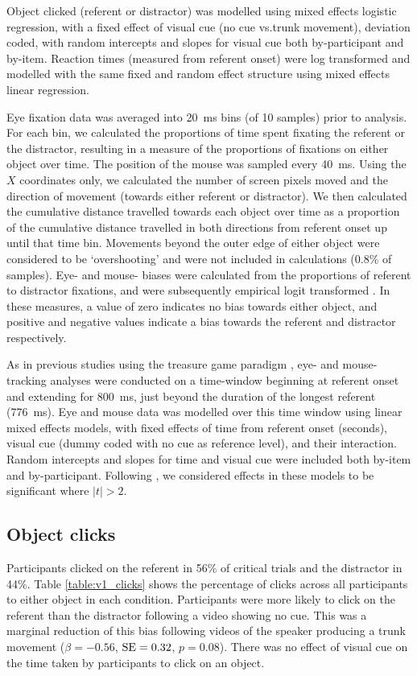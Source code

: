 \documentclass[a4paper,man,natbib]{apa6}
\newcommand{\resultsLog}[3]{$\beta = #1$, $\textnormal{SE} = #2$, $p #3$}
\begin{document}
Object clicked (referent or distractor) was modelled using mixed effects logistic regression, with a fixed effect of visual cue (no cue vs.\@ trunk movement), deviation coded, with random intercepts and slopes for visual cue both by-participant and by-item.
Reaction times (measured from referent onset) were log transformed and modelled with the same fixed and random effect structure using mixed effects linear regression.

Eye fixation data was averaged into 20~ms bins (of 10 samples) prior to analysis.
For each bin, we calculated the proportions of time spent fixating the referent or the distractor, resulting in a measure of the proportions of fixations on either object over time.
The position of the mouse was sampled every 40~ms.
Using the $X$ coordinates only, we calculated the number of screen pixels moved and the direction of movement (towards either referent or distractor).
We then calculated the cumulative distance travelled towards each object over time as a proportion of the cumulative distance travelled in both directions from referent onset up until that time bin.
Movements beyond the outer edge of either object were considered to be `overshooting' and were not included in calculations (0.8\% of samples).
Eye- and mouse- biases were calculated from the proportions of referent to distractor fixations, and were subsequently empirical logit transformed \citep{Barr2008}. 
In these measures, a value of zero indicates no bias towards either object, and positive and negative values indicate a bias towards the referent and distractor respectively.

As in previous studies using the treasure game paradigm \citep{King2018,Loy2017}, eye- and mouse- tracking analyses were conducted on a time-window beginning at referent onset and extending for 800~ms, just beyond the duration of the longest referent (776~ms).
Eye and mouse data was modelled over this time window using linear mixed effects models, with fixed effects of time from referent onset (seconds), visual cue (dummy coded with no cue as reference level), and their interaction.
Random intercepts and slopes for time and visual cue were included both by-item and by-participant.
Following \citet{Baayen2008}, we considered effects in these models to be significant where $|t|>2$.

\subsection{Object clicks}
Participants clicked on the referent in 56\% of critical trials and the distractor in 44\%.
Table \ref{table:v1_clicks} shows the percentage of clicks across all participants to either object in each condition.
Participants were more likely to click on the referent than the distractor following a video showing no cue. 
This was a marginal reduction of this bias following videos of the speaker producing a trunk movement (\resultsLog{-0.56}{0.32}{=0.08}).
There was no effect of visual cue on the time taken by participants to click on an object.
\end{document}
